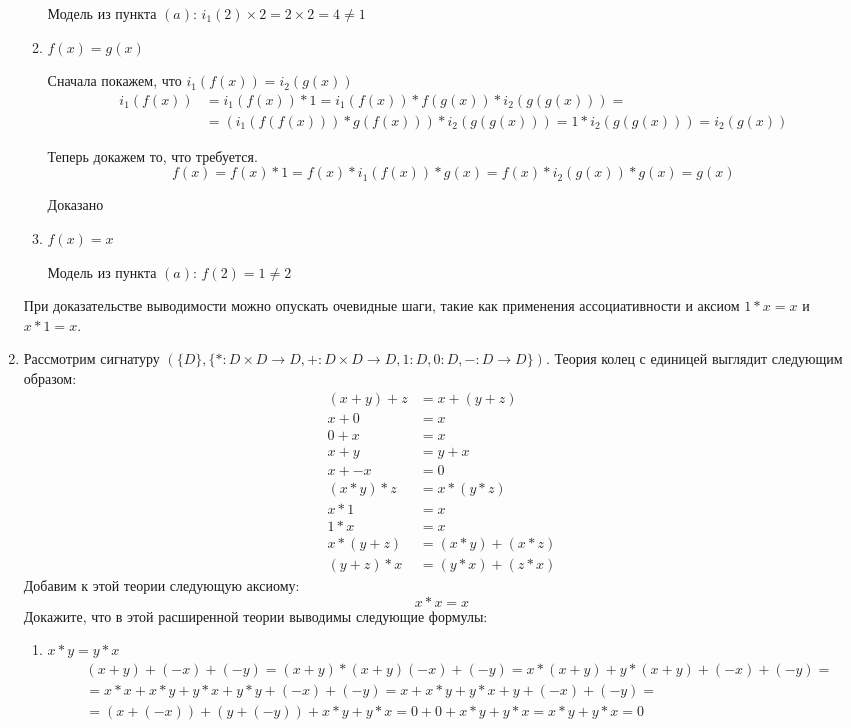 \begin{enumerate}
\begin{enumerate}
Модель из пункта $(a)$: $i_1(2) \times 2 = 2 \times 2 = 4 \neq 1$

\item $f(x) = g(x)$

Сначала покажем, что $i_1(f(x)) = i_2(g(x))$
\begin{align*}
	i_1(f(x)) &= i_1(f(x)) * 1 = i_1(f(x)) * f(g(x)) * i_2(g(g(x))) = \\
	&= (i_1(f(f(x))) * g(f(x))) * i_2(g(g(x))) = 1 * i_2(g(g(x))) = i_2(g(x))
\end{align*}

Теперь докажем то, что требуется.
\begin{equation*}
	f(x) = f(x) * 1 = f(x) * i_1(f(x)) * g(x) = f(x) * i_2(g(x)) * g(x) = g(x)
\end{equation*}

Доказано

\item $f(x) = x$

Модель из пункта $(a)$: $f(2) = 1 \neq 2$

\end{enumerate}
При доказательстве выводимости можно опускать очевидные шаги, такие как применения ассоциативности и аксиом $1 * 
x = x$ и $x * 1 = x$.

\item Рассмотрим сигнатуру $(\{D\}, \{ * : D \times D \to D, + : D \times D \to D, 1 : D, 0 : D, - : D \to D \})$.
    Теория колец с единицей выглядит следующим образом:
\begin{align*}
(x + y) + z & = x + (y + z) \\
x + 0 & = x \\
0 + x & = x \\
x + y & = y + x \\
x + -x & = 0 \\
(x * y) * z & = x * (y * z) \\
x * 1 & = x \\
1 * x & = x \\
x * (y + z) & = (x * y) + (x * z) \\
(y + z) * x & = (y * x) + (z * x)
\end{align*}
Добавим к этой теории следующую аксиому:
\[ x * x = x \]
Докажите, что в этой расширенной теории выводимы следующие формулы:
\begin{enumerate}
\item $x * y = y * x$
\begin{align*}
&(x + y) + (-x) + (-y) = (x + y)*(x + y) (-x) + (-y) = x*(x + y) + y*(x + y) + (-x) + (-y) = \\
&=x * x + x * y + y * x + y * y + (-x) + (-y) = x + x * y + y * x + y + (-x) + (-y) = \\
&=(x + (-x)) + (y + (-y)) + x * y + y * x = 0 + 0 + x * y + y * x = x * y + y * x = 0
\end{align*}


\end{enumerate}
\end{enumerate}
